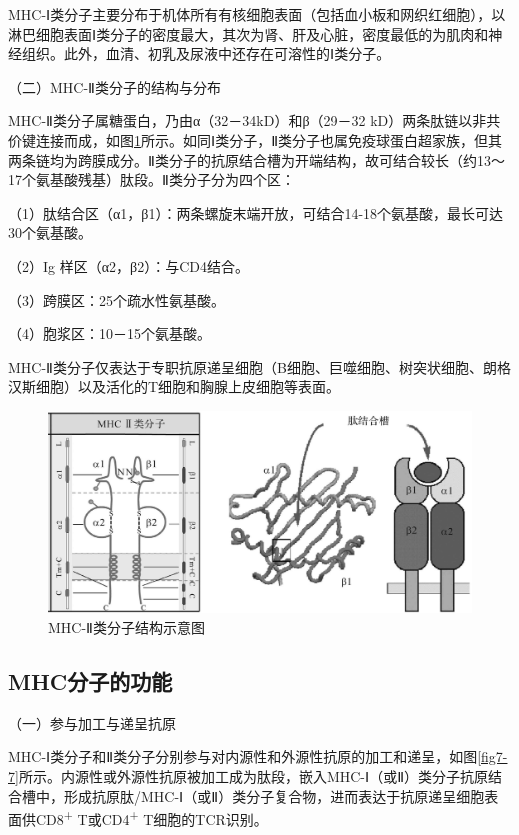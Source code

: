 MHC-Ⅰ类分子主要分布于机体所有有核细胞表面（包括血小板和网织红细胞），以淋巴细胞表面Ⅰ类分子的密度最大，其次为肾、肝及心脏，密度最低的为肌肉和神经组织。此外，血清、初乳及尿液中还存在可溶性的Ⅰ类分子。

（二）MHC-Ⅱ类分子的结构与分布

MHC-Ⅱ类分子属糖蛋白，乃由α（32－34kD）和β（29－32
kD）两条肽链以非共价键连接而成，如图\ref{fig7-6}所示。如同Ⅰ类分子，Ⅱ类分子也属免疫球蛋白超家族，但其两条链均为跨膜成分。Ⅱ类分子的抗原结合槽为开端结构，故可结合较长（约13～17个氨基酸残基）肽段。Ⅱ类分子分为四个区：

（1）肽结合区（α1，β1）：两条螺旋末端开放，可结合14-18个氨基酸，最长可达30个氨基酸。

（2）Ig 样区（α2，β2）：与CD4结合。

（3）跨膜区：25个疏水性氨基酸。

（4）胞浆区：10－15个氨基酸。

MHC-Ⅱ类分子仅表达于专职抗原递呈细胞（B细胞、巨噬细胞、树突状细胞、朗格汉斯细胞）以及活化的T细胞和胸腺上皮细胞等表面。

\begin{figure}[!htbp]
 \centering
 \includegraphics{./images/Image00107.jpg}
 \captionsetup{justification=centering}
 \caption{MHC-Ⅱ类分子结构示意图}
 \label{fig7-6}
  \end{figure} 


\subsection{MHC分子的功能}

（一）参与加工与递呈抗原

MHC-Ⅰ类分子和Ⅱ类分子分别参与对内源性和外源性抗原的加工和递呈，如图\ref{fig7-7}所示。内源性或外源性抗原被加工成为肽段，嵌入MHC-Ⅰ（或Ⅱ）类分子抗原结合槽中，形成抗原肽/MHC-Ⅰ（或Ⅱ）类分子复合物，进而表达于抗原递呈细胞表面供CD8\textsuperscript{+}
T或CD4\textsuperscript{+} T细胞的TCR识别。


